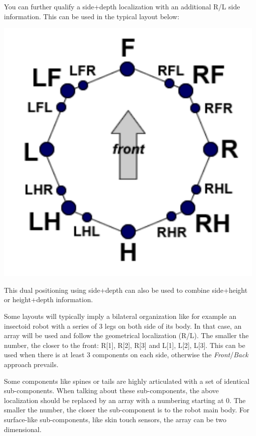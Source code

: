 You can further qualify a side+depth localization with an additional R/L
side information. This can be used in the typical layout below:

\begin{center}
  \includegraphics{img/lrfh}
\end{center}


This dual positioning using side+depth can also be used to combine
side+height or height+depth information.


Some layouts will typically imply a bilateral organization like for
example an insectoid robot with a series of 3 legs on both side of its
body. In that case, an array will be used and follow the geometrical
localization (R/L). The smaller the number, the closer to the front:
R[1], R[2], R[3] and L[1], L[2], L[3]. This can be used when there is
at least 3 components on each side, otherwise the
\textit{Front}/\textit{Back} approach prevails.


Some components like spines or tails are highly articulated with a set
of identical sub-components. When talking about these sub-components,
the above localization should be replaced by an array with a numbering
starting at 0. The smaller the number, the closer the sub-component is
to the robot main body. For surface-like sub-components, like skin
touch sensors, the array can be two dimensional.


